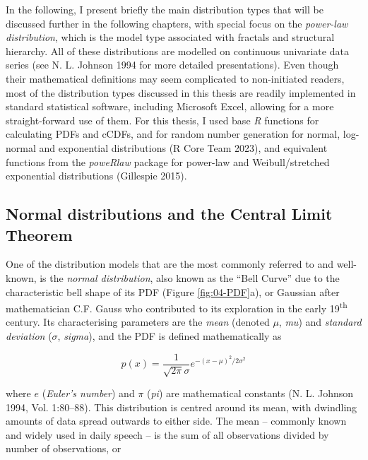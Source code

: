 \documentclass[
  12pt,
  a4paper, twoside]{book}
\begin{document}
In the following, I present briefly the main distribution types that will be discussed further in the following chapters, with special focus on the \emph{power-law distribution}, which is the model type associated with fractals and structural hierarchy. All of these distributions are modelled on continuous univariate data series (see N. L. Johnson 1994 for more detailed presentations). Even though their mathematical definitions may seem complicated to non-initiated readers, most of the distribution types discussed in this thesis are readily implemented in standard statistical software, including Microsoft Excel, allowing for a more straight-forward use of them. For this thesis, I used base \emph{R} functions for calculating PDFs and cCDFs, and for random number generation for normal, log-normal and exponential distributions (R Core Team 2023), and equivalent functions from the \emph{poweRlaw} package for power-law and Weibull/stretched exponential distributions (Gillespie 2015).

\FloatBarrier

\hypertarget{normal-dist}{%
\subsection{Normal distributions and the Central Limit Theorem}\label{normal-dist}}

One of the distribution models that are the most commonly referred to and well-known, is the \emph{normal distribution}, also known as the ``Bell Curve'' due to the characteristic bell shape of its PDF (Figure \ref{fig:04-PDF}a), or Gaussian after mathematician C.F. Gauss who contributed to its exploration in the early 19\textsuperscript{th} century. Its characterising parameters are the \emph{mean} (denoted \(\mu\), \emph{mu}) and \emph{standard deviation} (\(\sigma\), \emph{sigma}), and the PDF is defined mathematically as

\begin{equation}
p(x)=\frac{1}{\sqrt{2\pi}\sigma}e^{-(x-\mu)^2/2\sigma^2}
\label{eq:normal}
\end{equation}

where \(e\) (\emph{Euler's number}) and \(\pi\) (\emph{pi}) are mathematical constants (N. L. Johnson 1994, Vol. 1:80--88). This distribution is centred around its mean, with dwindling amounts of data spread outwards to either side. The mean -- commonly known and widely used in daily speech -- is the sum of all observations divided by number of observations, or
\end{document}
